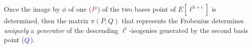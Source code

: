 \documentclass[10pt,a4paper]{beamer}
\theoremstyle{plain}
\theoremstyle{definition}
\theoremstyle{definition}
\theoremstyle{definition}
\theoremstyle{definition}
\theoremstyle{remark}
\theoremstyle{remark}
\begin{document}
\begin{frame}
\begin{center}
\end{center}
Once the image by $\phi$ of one ($\color{red} P$) of the two bases point of $E[\ell^{h+i}]$ is 
determined, then the matrix $\pi(P,Q)$ that represents the Frobenius determines \emph{uniquely} a \emph{generator} of the
descending $\ell^{i}$-isogenies generated by the second basis point ($\color{blue} Q$). 
\end{frame}

\end{document}
